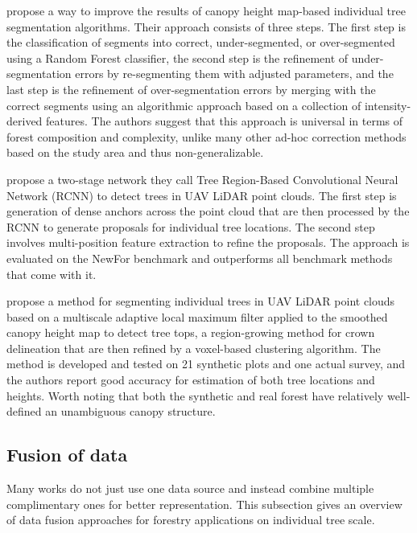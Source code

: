 \citet{lisiewiczCorrectingResultsCHMBased2022} propose a way to improve the results of canopy height map-based individual tree segmentation algorithms.
Their approach consists of three steps.
The first step is the classification of segments into correct, under-segmented, or over-segmented using a Random Forest classifier, the second step is the refinement of under-segmentation errors by re-segmenting them with adjusted parameters, and the last step is the refinement of over-segmentation errors by merging with the correct segments using an algorithmic approach based on a collection of intensity-derived features.
The authors suggest that this approach is universal in terms of forest composition and complexity, unlike many other ad-hoc correction methods based on the study area and thus non-generalizable.

\citet{wangAutomaticDetectionIndividual2023} propose a two-stage network they call Tree Region-Based Convolutional Neural Network (RCNN) to detect trees in UAV LiDAR point clouds.
The first step is generation of dense anchors across the point cloud that are then processed by the RCNN to generate proposals for individual tree locations.
The second step involves multi-position feature extraction to refine the proposals.
The approach is evaluated on the NewFor benchmark \citep{eysnAlpineITDBenchmark2015} and outperforms all benchmark methods that come with it.

\citet{fuIndividualTreeSegmentationUAV2024} propose a method for segmenting individual trees in UAV LiDAR point clouds based on a multiscale adaptive local maximum filter applied to the smoothed canopy height map to detect tree tops, a region-growing method for crown delineation that are then refined by a voxel-based clustering algorithm.
The method is developed and tested on 21 synthetic plots and one actual survey, and the authors report good accuracy for estimation of both tree locations and heights.
Worth noting that both the synthetic and real forest have relatively well-defined an unambiguous canopy structure.

\subsection{Fusion of data}

Many works do not just use one data source and instead combine multiple complimentary ones for better representation.
This subsection gives an overview of data fusion approaches for forestry applications on individual tree scale.

